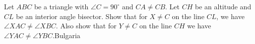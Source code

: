 Let $ABC$ be a triangle with $\angle C = 90^\circ$ and $CA \neq CB$. Let $CH$ be an altitude and $CL$ be an interior angle bisector. Show that for $X \neq C$ on the line $CL$, we have $\angle XAC \neq \angle XBC$. Also show that for $Y \neq C$ on the line $CH$ we have $\angle YAC \neq \angle YBC$.Bulgaria